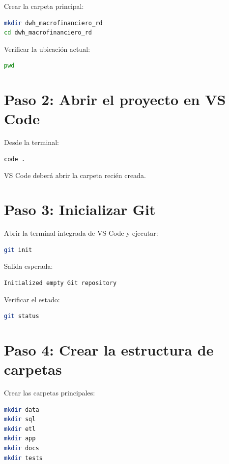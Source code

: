 Crear la carpeta principal:

\begin{lstlisting}[language=bash]
mkdir dwh_macrofinanciero_rd
cd dwh_macrofinanciero_rd
\end{lstlisting}

Verificar la ubicación actual:

\begin{lstlisting}[language=bash]
pwd
\end{lstlisting}

\section{Paso 2: Abrir el proyecto en VS Code}

Desde la terminal:

\begin{lstlisting}[language=bash]
code .
\end{lstlisting}

VS Code deberá abrir la carpeta recién creada.

\section{Paso 3: Inicializar Git}

Abrir la terminal integrada de VS Code y ejecutar:

\begin{lstlisting}[language=bash]
git init
\end{lstlisting}

Salida esperada:

\begin{verbatim}
Initialized empty Git repository
\end{verbatim}

Verificar el estado:

\begin{lstlisting}[language=bash]
git status
\end{lstlisting}

\section{Paso 4: Crear la estructura de carpetas}

Crear las carpetas principales:

\begin{lstlisting}[language=bash]
mkdir data
mkdir sql
mkdir etl
mkdir app
mkdir docs
mkdir tests
\end{lstlisting}

